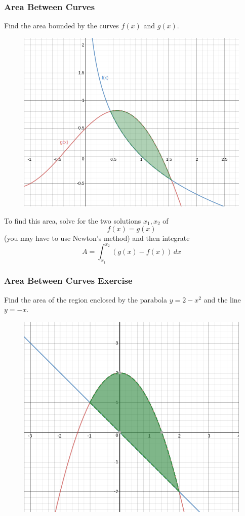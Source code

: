 \documentclass[xcolor=dvipsnames]{beamer}
\begin{document}
\begin{frame}
  \frametitle{Area Between Curves}
  Find the area bounded by the curves $f(x)$ and $g(x)$.
\begin{figure}[h]
\includegraphics[scale=.15]{./diagrams/areabetwcurs.png}
\end{figure}
To find this area, solve for the two solutions $x_{1},x_{2}$ of 
\begin{equation}
  \label{eq:aikooyae}
  f(x)=g(x)
\end{equation}
(you may have to use Newton's method) and then integrate
\begin{equation}
  \label{eq:upofahma}
  A=\int_{x_{1}}^{x_{2}}\left(g(x)-f(x)\right)\,dx
\end{equation}
\end{frame}

\begin{frame}
  \frametitle{Area Between Curves Exercise}
{\ubung} Find the area of the region enclosed by the parabola
$y=2-x^{2}$ and the line $y=-x$. 
\begin{figure}[h]
  \includegraphics[scale=0.2]{./diagrams/areabc.png}
\end{figure}
\end{frame}
\end{document}
